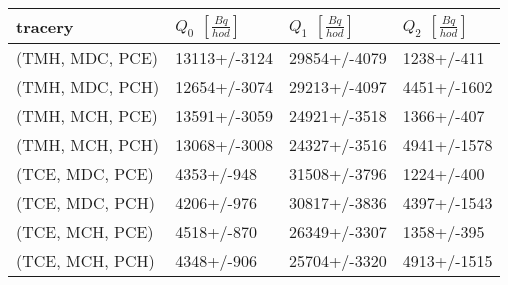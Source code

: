 \begin{tabular}{llll}
\toprule
tracery & $Q_0$ $\left[\si{\frac{Bq}{hod}}\right]$ & $Q_1$ $\left[\si{\frac{Bq}{hod}}\right]$ & $Q_2$ $\left[\si{\frac{Bq}{hod}}\right]$ \\
\midrule
(TMH, MDC, PCE) &                             13113+/-3124 &                             29854+/-4079 &                               1238+/-411 \\
(TMH, MDC, PCH) &                             12654+/-3074 &                             29213+/-4097 &                              4451+/-1602 \\
(TMH, MCH, PCE) &                             13591+/-3059 &                             24921+/-3518 &                               1366+/-407 \\
(TMH, MCH, PCH) &                             13068+/-3008 &                             24327+/-3516 &                              4941+/-1578 \\
(TCE, MDC, PCE) &                               4353+/-948 &                             31508+/-3796 &                               1224+/-400 \\
(TCE, MDC, PCH) &                               4206+/-976 &                             30817+/-3836 &                              4397+/-1543 \\
(TCE, MCH, PCE) &                               4518+/-870 &                             26349+/-3307 &                               1358+/-395 \\
(TCE, MCH, PCH) &                               4348+/-906 &                             25704+/-3320 &                              4913+/-1515 \\
\bottomrule
\end{tabular}
